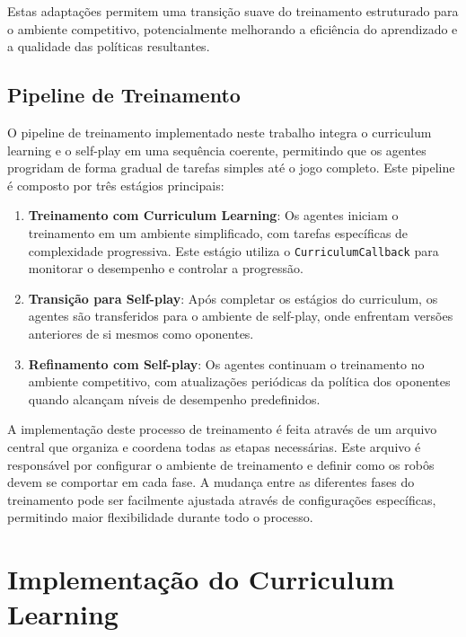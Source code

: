 Estas adaptações permitem uma transição suave do treinamento estruturado para o ambiente competitivo, potencialmente melhorando a eficiência do aprendizado e a qualidade das políticas resultantes.

\subsection{Pipeline de Treinamento}

O pipeline de treinamento implementado neste trabalho integra o curriculum learning e o self-play em uma sequência coerente, permitindo que os agentes progridam de forma gradual de tarefas simples até o jogo completo. Este pipeline é composto por três estágios principais:

\begin{enumerate}
    \item \textbf{Treinamento com Curriculum Learning}: Os agentes iniciam o treinamento em um ambiente simplificado, com tarefas específicas de complexidade progressiva. Este estágio utiliza o \texttt{CurriculumCallback} para monitorar o desempenho e controlar a progressão.
    
    \item \textbf{Transição para Self-play}: Após completar os estágios do curriculum, os agentes são transferidos para o ambiente de self-play, onde enfrentam versões anteriores de si mesmos como oponentes.
    
    \item \textbf{Refinamento com Self-play}: Os agentes continuam o treinamento no ambiente competitivo, com atualizações periódicas da política dos oponentes quando alcançam níveis de desempenho predefinidos.
\end{enumerate}

A implementação deste processo de treinamento é feita através de um arquivo central que organiza e coordena todas as etapas necessárias. Este arquivo é responsável por configurar o ambiente de treinamento e definir como os robôs devem se comportar em cada fase. A mudança entre as diferentes fases do treinamento pode ser facilmente ajustada através de configurações específicas, permitindo maior flexibilidade durante todo o processo.

\section{Implementação do Curriculum Learning}
\label{sec:implementacao_cl}

